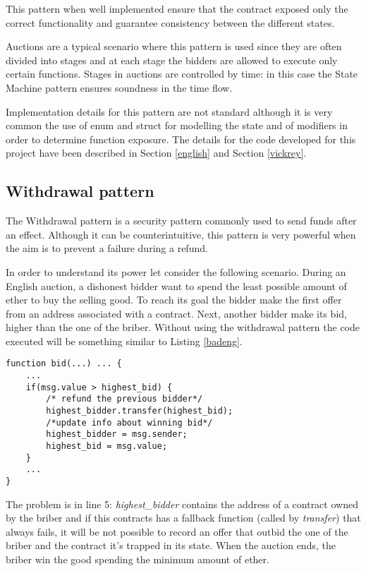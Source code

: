 \documentclass{article}
\begin{document}
This pattern when well implemented ensure that the contract exposed only the correct functionality and guarantee consistency between the different states.

Auctions are a typical scenario where this pattern is used since they are often divided into stages and at each stage the bidders are allowed to execute only certain functions. Stages in auctions are controlled by time: in this case the State Machine pattern ensures soundness in the time flow.

Implementation details for this pattern are not standard although it is very common the use of enum and struct for modelling the state and of modifiers in order to determine function exposure. The details for the code developed for this project have been described in Section \ref{english} and Section \ref{vickrey}.
\subsection{Withdrawal pattern}\label{withdrawal}
The Withdrawal pattern is a security pattern commonly used to send funds after an effect. Although it can be counterintuitive, this pattern is very powerful when the aim is to prevent a failure during a refund.

In order to understand its power let consider the following scenario. 
During an English auction, a dishonest bidder want to spend the least possible amount of ether to buy the selling good. To reach its goal the bidder make the first offer from an address associated with a contract. Next, another bidder make its bid, higher than the one of the briber. Without using the withdrawal pattern the code executed will be something similar to Listing \ref{badeng}.

\begin{lstlisting}[language=Solidity, caption={Buggy code that do not use the withdrawal pattern},captionpos=b, label=badeng]
 function bid(...) ... {
    ...
    if(msg.value > highest_bid) {
        /* refund the previous bidder*/
        highest_bidder.transfer(highest_bid);
        /*update info about winning bid*/
        highest_bidder = msg.sender;
        highest_bid = msg.value;
    }
    ...   
}
\end{lstlisting}

The problem is in line 5: \textit{highest\_bidder} contains the address of a contract owned by the briber and if this contracts has a fallback function (called by \textit{transfer}) that always fails, it will be not possible to record an offer that outbid the one of the briber and the contract it's trapped in its state. When the auction ends, the briber win the good spending the minimum amount of ether.
\end{document}
